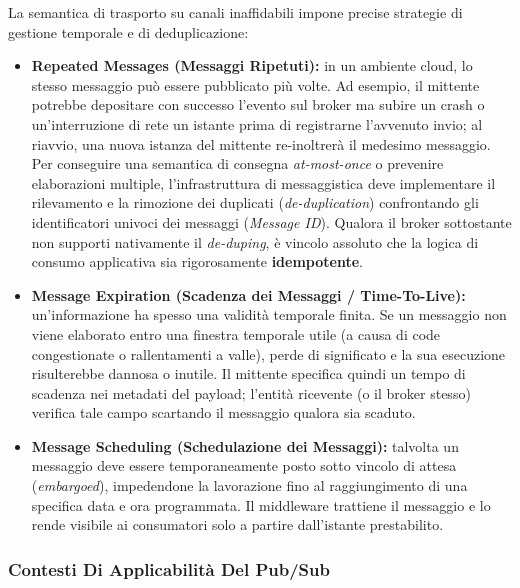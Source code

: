\documentclass[11pt, a4paper]{article}
\begin{document}
La semantica di trasporto su canali inaffidabili impone precise strategie di gestione temporale e di deduplicazione:
\begin{itemize}
    \item \textbf{Repeated Messages (Messaggi Ripetuti):} in un ambiente cloud, lo stesso messaggio può essere pubblicato più volte. Ad esempio, il mittente potrebbe depositare con successo l'evento sul broker ma subire un crash o un'interruzione di rete un istante prima di registrarne l'avvenuto invio; al riavvio, una nuova istanza del mittente re-inoltrerà il medesimo messaggio. Per conseguire una semantica di consegna \emph{at-most-once} o prevenire elaborazioni multiple, l'infrastruttura di messaggistica deve implementare il rilevamento e la rimozione dei duplicati (\emph{de-duplication}) confrontando gli identificatori univoci dei messaggi (\emph{Message ID}). Qualora il broker sottostante non supporti nativamente il \emph{de-duping}, è vincolo assoluto che la logica di consumo applicativa sia rigorosamente \textbf{idempotente}.
    \item \textbf{Message Expiration (Scadenza dei Messaggi / Time-To-Live):} un'informazione ha spesso una validità temporale finita. Se un messaggio non viene elaborato entro una finestra temporale utile (a causa di code congestionate o rallentamenti a valle), perde di significato e la sua esecuzione risulterebbe dannosa o inutile. Il mittente specifica quindi un tempo di scadenza nei metadati del payload; l'entità ricevente (o il broker stesso) verifica tale campo scartando il messaggio qualora sia scaduto.
    \item \textbf{Message Scheduling (Schedulazione dei Messaggi):} talvolta un messaggio deve essere temporaneamente posto sotto vincolo di attesa (\emph{embargoed}), impedendone la lavorazione fino al raggiungimento di una specifica data e ora programmata. Il middleware trattiene il messaggio e lo rende visibile ai consumatori solo a partire dall'istante prestabilito.
\end{itemize}

\subsubsection{Contesti Di Applicabilità Del Pub/Sub}
\end{document}
